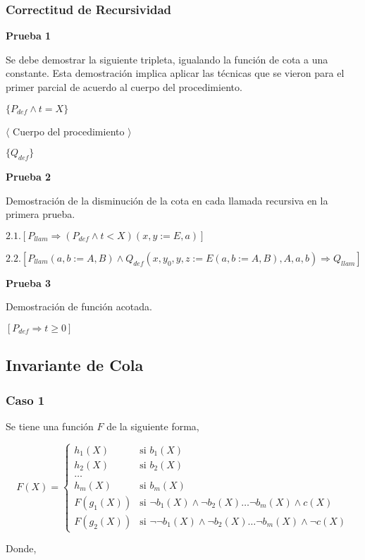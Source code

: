 \documentclass[hidelinks]{article}
\begin{document}
\subsubsection{Correctitud de Recursividad}

\textbf{Prueba 1}\par
Se debe demostrar la siguiente tripleta, igualando la función de cota a una
constante. Esta demostración implica aplicar las técnicas que se vieron para el
primer parcial de acuerdo al cuerpo del procedimiento.\par
$\{P_{def} \land t = X\}$\par
$\langle$ Cuerpo del procedimiento $\rangle$\par
$\{Q_{def}\}$\par

\textbf{Prueba 2}\par
Demostración de la disminución de la cota en cada llamada recursiva en la
primera prueba.\par
$2.1. [P_{llam} \Rightarrow (P_{def} \land t < X)(x,y := E, a)]$\par
$2.2. [P_{llam}(a,b := A,B) \land Q_{def}(x,y_0,y,z := E(a,b := A,B), A, a, b) \Rightarrow Q_{llam}]$\par

\textbf{Prueba 3}\par
Demostración de función acotada.\par
$[P_{def} \Rightarrow t \geq 0]$\par

\subsection{Invariante de Cola}\par

\subsubsection{Caso 1}

Se tiene una función $F$ de la siguiente forma,\par

\begin{equation}
	F(X) =
	\begin{cases}
		h_1(X)    & \text{si } b_1(X)                                                               \\
		h_2(X)    & \text{si } b_2(X)                                                               \\
		\dots                                                                                       \\
		h_m(X)    & \text{si } b_m(X)                                                               \\
		F(g_1(X)) & \text{si } \neg b_1(X) \land \neg b_2(X) \dots \neg b_m(X) \land c(X)           \\
		F(g_2(X)) & \text{si } \neg \neg b_1(X) \land \neg b_2(X) \dots \neg b_m(X) \land \neg c(X)
	\end{cases}
\end{equation} \par
Donde,\par
\end{document}
